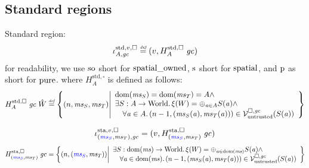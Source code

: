 \documentclass[a4paper]{article}
\begin{document}
\subsection{Standard regions}
\label{sec:standard-regions}
Standard region:
\[
  \stdreg{A,\gc}{v} \defeq (v,H_A^{\mathrm{std},\square} \; \gc)
\]
for readability, we use $\spao$ short for $\spatialo$, $\spa$ short for $\spatial$, and $\pur$ as short for $\pure$.
where $H^{\mathrm{std},\square}_A$ is defined as follows:
\[
  H_A^{\mathrm{std},\square} \; \gc \; \hat{W} \defeq \left\{ \npair{\ms_S,\ms_T} \middle|
    \begin{array}{l}
      \dom(\ms_S) = \dom(\ms_T) = A \wedge \\
      \exists S : A \fun \World \ldotp \xi(W) = \oplus_{\aaddr \in A} S(\aaddr) \wedge\\
      \quad \forall \aaddr \in A \ldotp \npair[n-1]{(\ms_S(\aaddr),\ms_T(\aaddr))} \in \lrv(S(\aaddr))
    \end{array}
  \right\}
\]

\[
  \stareg[\stpair{\ms}{\ms},\gc]{v,\square} = (v,H^\mathrm{sta,\square}_{\stpair{\ms}{\ms}} \; \gc)
\]
\[
  H^\mathrm{sta,\square}_{\stpair{\ms}{\ms}} \; \gc = \left\{ \npair{\stpair{\ms}{\ms}} \middle| 
    \begin{array}{l}
      \exists S : \dom(\ms) \fun \World \ldotp \xi(W) = \oplus_{\aaddr \in \dom(\ms)} S(\aaddr) \wedge\\
      \quad \forall \aaddr \in \dom(\ms) \ldotp \npair[n-1]{(\ms_S(\aaddr),\ms_T(\aaddr))} \in \lrv(S(\aaddr))
    \end{array}
\right\}
\]

\end{document}
